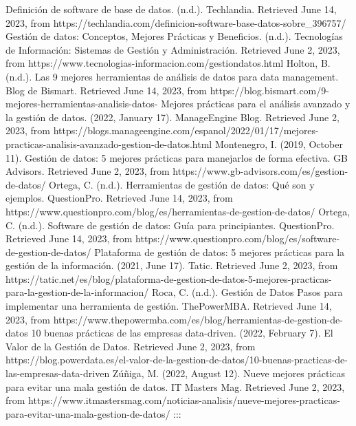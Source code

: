 \documentclass[
  letterpaper,
  DIV=11,
  numbers=noendperiod]{scrreprt}
\begin{document}
Definición de software de base de datos. (n.d.). Techlandia. Retrieved
June 14, 2023, from
https://techlandia.com/definicion-software-base-datos-sobre\_396757/
Gestión de datos: Conceptos, Mejores Prácticas y Beneficios. (n.d.).
Tecnologías de Información: Sistemas de Gestión y Administración.
Retrieved June 2, 2023, from
https://www.tecnologias-informacion.com/gestiondatos.html Holton, B.
(n.d.). Las 9 mejores herramientas de análisis de datos para data
management. Blog de Bismart. Retrieved June 14, 2023, from
https://blog.bismart.com/9-mejores-herramientas-analisis-datos- Mejores
prácticas para el análisis avanzado y la gestión de datos. (2022,
January 17). ManageEngine Blog. Retrieved June 2, 2023, from
https://blogs.manageengine.com/espanol/2022/01/17/mejores-practicas-analisis-avanzado-gestion-de-datos.html
Montenegro, I. (2019, October 11). Gestión de datos: 5 mejores prácticas
para manejarlos de forma efectiva. GB Advisors. Retrieved June 2, 2023,
from https://www.gb-advisors.com/es/gestion-de-datos/ Ortega, C. (n.d.).
Herramientas de gestión de datos: Qué son y ejemplos. QuestionPro.
Retrieved June 14, 2023, from
https://www.questionpro.com/blog/es/herramientas-de-gestion-de-datos/
Ortega, C. (n.d.). Software de gestión de datos: Guía para
principiantes. QuestionPro. Retrieved June 14, 2023, from
https://www.questionpro.com/blog/es/software-de-gestion-de-datos/
Plataforma de gestión de datos: 5 mejores prácticas para la gestión de
la información. (2021, June 17). Tatic. Retrieved June 2, 2023, from
https://tatic.net/es/blog/plataforma-de-gestion-de-datos-5-mejores-practicas-para-la-gestion-de-la-informacion/
Roca, C. (n.d.). Gestión de Datos \textbar{} Pasos para implementar una
herramienta de gestión. ThePowerMBA. Retrieved June 14, 2023, from
https://www.thepowermba.com/es/blog/herramientas-de-gestion-de-datos 10
buenas prácticas de las empresas data-driven. (2022, February 7). El
Valor de la Gestión de Datos. Retrieved June 2, 2023, from
https://blog.powerdata.es/el-valor-de-la-gestion-de-datos/10-buenas-practicas-de-las-empresas-data-driven
Zúñiga, M. (2022, August 12). Nueve mejores prácticas para evitar una
mala gestión de datos. IT Masters Mag. Retrieved June 2, 2023, from
https://www.itmastersmag.com/noticias-analisis/nueve-mejores-practicas-para-evitar-una-mala-gestion-de-datos/
:::
\end{document}

